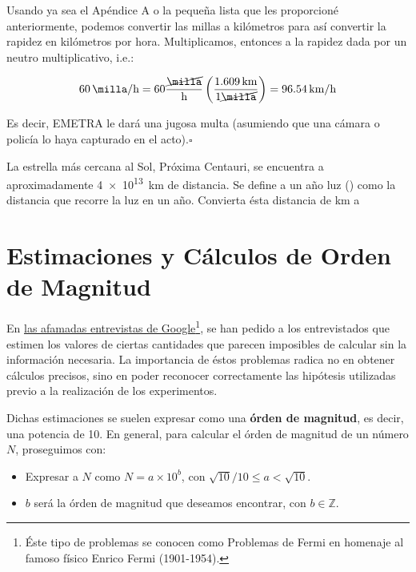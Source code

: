 \begin{solution*}
Usando ya sea el Ap\'endice A o la peque\~na lista que les proporcion\'e anteriormente, podemos convertir las millas a kil\'ometros para as\'i convertir la rapidez en kil\'ometros por hora. Multiplicamos, entonces a la rapidez dada por un neutro multiplicativo, i.e.:

\[ \SI{60}{\milla/\hour} = 60 \frac{\cancel{\si{\milla}}}{\si{\hour}} \left(\frac{\SI{1.609}{\kilo\meter}}{1\cancel{\si{\milla}}}\right) = \SI{96.54}{\kilo\meter/\hour} \]

Es decir, EMETRA le dar\'a una jugosa multa (asumiendo que una c\'amara o polic\'ia lo haya capturado en el acto).\hfill $\square$
\end{solution*}

\begin{ejercicio}
La estrella m\'as cercana al Sol, Pr\'oxima Centauri, se encuentra a aproximadamente \SI{4e13}{\kilo\meter} de distancia. Se define a un a\~no luz (\si{\aluz}) como la distancia que recorre la luz en un a\~no. Convierta \'esta distancia de \si{\kilo\meter} a \si{\aluz}
\end{ejercicio}


\section{Estimaciones y C\'alculos de Orden de Magnitud}\label{sec:ordenmagn1}

En \href{https://www.quora.com/If-you-were-at-a-Google-interview-how-would-you-answer-How-many-views-does-YouTube-have-per-day}{las afamadas entrevistas de Google}\footnote{\'Este tipo de problemas se conocen como Problemas de Fermi en homenaje al famoso f\'isico Enrico Fermi (1901-1954).}, se han pedido a los entrevistados que estimen los valores de ciertas cantidades que parecen imposibles de calcular sin la informaci\'on necesaria. La importancia de \'estos problemas radica no en obtener c\'alculos precisos, sino en poder reconocer correctamente las hip\'otesis utilizadas previo a la realizaci\'on de los experimentos.

Dichas estimaciones se suelen expresar como una \textbf{\'orden de magnitud}, es decir, una potencia de 10. En general, para calcular el \'orden de magnitud de un n\'umero $N$, proseguimos con:

\begin{itemize}
    \item Expresar a $N$ como $N=a\times10^{b}$, con $\sqrt{10}/10\leq a < \sqrt{10}$.
    \item $b$ ser\'a la \'orden de magnitud que deseamos encontrar, con $b\in\mathbb{Z}$.
\end{itemize}

